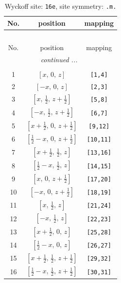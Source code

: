 \documentclass[fleqn,8pt]{jsarticle}
\begin{document}
\begin{longtable}{ccc}
\caption{Wyckoff site: {\tt 16e}, site symmetry: {\tt .m.}}
 \\
 \hline \hline
No. & position & mapping \\ \hline \endfirsthead

\multicolumn{2}{l}{\tablename\ \thetable{}} \\
 \hline \hline
No. & position & mapping \\ \hline \endhead

 \hline \hline
\multicolumn{2}{r}{\footnotesize\it continued ...} \\ \endfoot

 \hline \hline
\multicolumn{2}{r}{} \\ \endlastfoot

1 & $\left[ x,\, 0,\, z \right]$ & {\tt [1,4]} \\ \hline
2 & $\left[ - x,\, 0,\, z \right]$ & {\tt [2,3]} \\ \hline
3 & $\left[ x,\, \frac{1}{2},\, z + \frac{1}{2} \right]$ & {\tt [5,8]} \\ \hline
4 & $\left[ - x,\, \frac{1}{2},\, z + \frac{1}{2} \right]$ & {\tt [6,7]} \\ \hline
5 & $\left[ x + \frac{1}{2},\, 0,\, z + \frac{1}{2} \right]$ & {\tt [9,12]} \\ \hline
6 & $\left[ \frac{1}{2} - x,\, 0,\, z + \frac{1}{2} \right]$ & {\tt [10,11]} \\ \hline
7 & $\left[ x + \frac{1}{2},\, \frac{1}{2},\, z \right]$ & {\tt [13,16]} \\ \hline
8 & $\left[ \frac{1}{2} - x,\, \frac{1}{2},\, z \right]$ & {\tt [14,15]} \\ \hline
9 & $\left[ x,\, 0,\, z + \frac{1}{2} \right]$ & {\tt [17,20]} \\ \hline
10 & $\left[ - x,\, 0,\, z + \frac{1}{2} \right]$ & {\tt [18,19]} \\ \hline
11 & $\left[ x,\, \frac{1}{2},\, z \right]$ & {\tt [21,24]} \\ \hline
12 & $\left[ - x,\, \frac{1}{2},\, z \right]$ & {\tt [22,23]} \\ \hline
13 & $\left[ x + \frac{1}{2},\, 0,\, z \right]$ & {\tt [25,28]} \\ \hline
14 & $\left[ \frac{1}{2} - x,\, 0,\, z \right]$ & {\tt [26,27]} \\ \hline
15 & $\left[ x + \frac{1}{2},\, \frac{1}{2},\, z + \frac{1}{2} \right]$ & {\tt [29,32]} \\ \hline
16 & $\left[ \frac{1}{2} - x,\, \frac{1}{2},\, z + \frac{1}{2} \right]$ & {\tt [30,31]} \\
\end{longtable}
\end{document}
